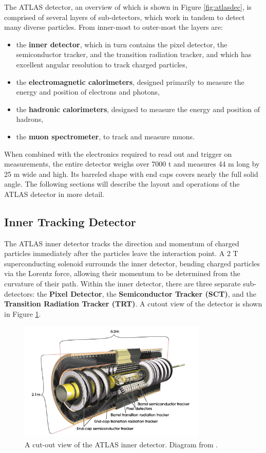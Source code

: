 The ATLAS detector, an overview of which is shown in Figure \ref{fig:atlasdec}, is comprised of several layers of sub-detectors, which work in tandem to detect many diverse particles. From inner-most to outer-most the layers are:

\begin{itemize}
    \item the \textbf{inner detector}, which in turn contains the pixel detector, the semiconductor tracker, and the transition radiation tracker, and which has excellent angular resolution to track charged particles,
    \item the \textbf{electromagnetic calorimeters}, designed primarily to measure the energy and position of electrons and photons,
    \item the \textbf{hadronic calorimeters}, designed to measure the energy and position of hadrons,
    \item the \textbf{muon spectrometer}, to track and measure muons.
\end{itemize}

When combined with the electronics required to read out and trigger on measurements, the entire detector weighs over 7000 t and measures 44 m long by 25 m wide and high. Its barreled shape with end caps covers nearly the full solid angle. The following sections will describe the layout and operations of the ATLAS detector in more detail.

\subsection{Inner Tracking Detector}
The ATLAS inner detector tracks the direction and momentum of charged particles immediately after the particles leave the interaction point. A 2 T superconducting solenoid surrounds the inner detector, bending charged particles via the Lorentz force, allowing their momentum to be determined from the curvature of their path. Within the inner detector, there are three separate sub-detectors: the \textbf{Pixel Detector}, the \textbf{Semiconductor Tracker (SCT)}, and the \textbf{Transition Radiation Tracker (TRT)}. A cutout view of the detector is shown in Figure \ref{fig:atlasinner}.

\begin{figure}[H]
    \centering
    \includegraphics[width=0.8\textwidth]{Figures/2/InnerDetector.png}
    \caption{A cut-out view of the ATLAS inner detector. Diagram from \cite{ATLASDesign}.}
    \label{fig:atlasinner}
\end{figure}

